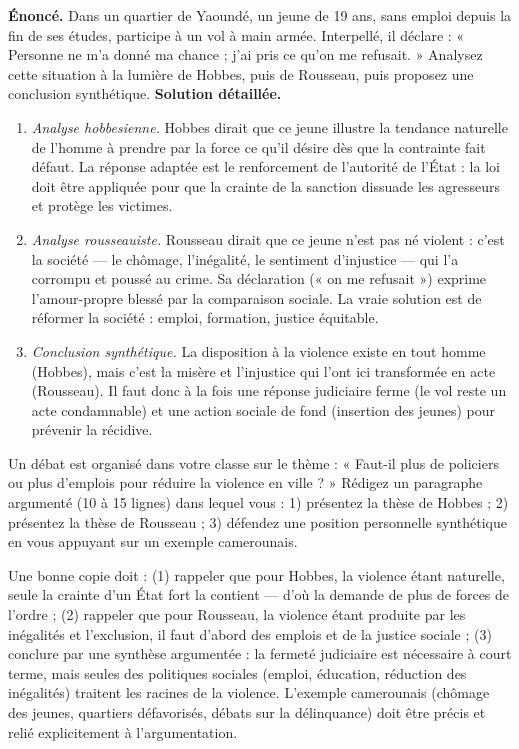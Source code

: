 \documentclass[11pt]{article}
\begin{document}
\begin{exoresolu}
\textbf{Énoncé.} Dans un quartier de Yaoundé, un jeune de 19 ans, sans emploi depuis la fin de ses études, participe à un vol à main armée. Interpellé, il déclare : « Personne ne m'a donné ma chance ; j'ai pris ce qu'on me refusait. » Analysez cette situation à la lumière de Hobbes, puis de Rousseau, puis proposez une conclusion synthétique.
\tcblower
\textbf{Solution détaillée.}
\begin{enumerate}
\item \emph{Analyse hobbesienne.} Hobbes dirait que ce jeune illustre la tendance naturelle de l'homme à prendre par la force ce qu'il désire dès que la contrainte fait défaut. La réponse adaptée est le renforcement de l'autorité de l'État : la loi doit être appliquée pour que la crainte de la sanction dissuade les agresseurs et protège les victimes.
\item \emph{Analyse rousseauiste.} Rousseau dirait que ce jeune n'est pas né violent : c'est la société — le chômage, l'inégalité, le sentiment d'injustice — qui l'a corrompu et poussé au crime. Sa déclaration (« on me refusait ») exprime l'amour-propre blessé par la comparaison sociale. La vraie solution est de réformer la société : emploi, formation, justice équitable.
\item \emph{Conclusion synthétique.} La disposition à la violence existe en tout homme (Hobbes), mais c'est la misère et l'injustice qui l'ont ici transformée en acte (Rousseau). Il faut donc à la fois une réponse judiciaire ferme (le vol reste un acte condamnable) et une action sociale de fond (insertion des jeunes) pour prévenir la récidive.
\end{enumerate}
\end{exoresolu}

\begin{exercice}
Un débat est organisé dans votre classe sur le thème : « Faut-il plus de policiers ou plus d'emplois pour réduire la violence en ville ? » Rédigez un paragraphe argumenté (10 à 15 lignes) dans lequel vous : 1) présentez la thèse de Hobbes ; 2) présentez la thèse de Rousseau ; 3) défendez une position personnelle synthétique en vous appuyant sur un exemple camerounais.
\end{exercice}

\begin{corrige}
Une bonne copie doit : (1) rappeler que pour Hobbes, la violence étant naturelle, seule la crainte d'un État fort la contient — d'où la demande de plus de forces de l'ordre ; (2) rappeler que pour Rousseau, la violence étant produite par les inégalités et l'exclusion, il faut d'abord des emplois et de la justice sociale ; (3) conclure par une synthèse argumentée : la fermeté judiciaire est nécessaire à court terme, mais seules des politiques sociales (emploi, éducation, réduction des inégalités) traitent les racines de la violence. L'exemple camerounais (chômage des jeunes, quartiers défavorisés, débats sur la délinquance) doit être précis et relié explicitement à l'argumentation.
\end{corrige}
\end{document}
